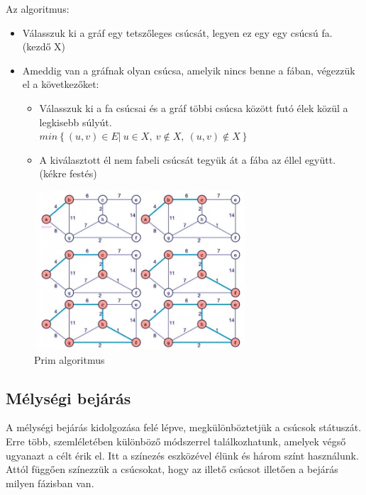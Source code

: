 \documentclass[margin=0px]{article}
\begin{document}
    \noindent Az algoritmus:
	\begin{itemize}
        \item Válasszuk ki a gráf egy tetszőleges csúcsát, legyen ez egy egy csúcsú fa. (kezdő X)
        \item Ameddig van a gráfnak olyan csúcsa, amelyik nincs benne a fában, végezzük el a következőket:
        \begin{itemize}
            \item Válasszuk ki a fa csúcsai és a gráf többi csúcsa között futó élek közül a legkisebb súlyút.\\
            $min\left\{(u, v) \in E\Big|\ u \in X,\ v \not \in X,\ (u, v) \not \in X\right\}$
            \item A kiválasztott él nem fabeli csúcsát tegyük át a fába az éllel együtt. (kékre festés)
        \end{itemize}
    \end{itemize}
    
	\begin{figure}[H]
		\centering
		\includegraphics[width=0.7\textwidth]{img/spanning_tree.jpg}
		\caption{Prim algoritmus}
		\label{fig:Prim_sample}
	\end{figure}    

	\subsection*{Mélységi bejárás}

    \noindent A mélységi bejárás kidolgozása felé lépve, megkülönböztetjük a csúcsok státuszát. Erre több, szemléletében különböző módszerrel találkozhatunk, amelyek végső ugyanazt a célt érik el. Itt a színezés eszközével élünk és három színt használunk. Attól függően színezzük a csúcsokat, hogy az illető csúcsot illetően a bejárás milyen fázisban van.\\
\end{document}
